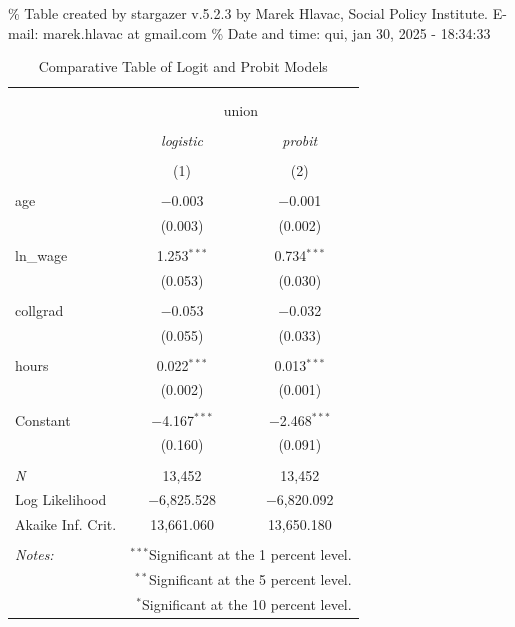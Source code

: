 \documentclass[
]{article}
\begin{document}
\% Table created by stargazer v.5.2.3 by Marek Hlavac, Social Policy
Institute. E-mail: marek.hlavac at gmail.com \% Date and time: qui, jan
30, 2025 - 18:34:33

\begin{table}[!htbp] \centering 
  \caption{Comparative Table of Logit and Probit Models} 
  \label{} 
\begin{tabular}{@{\extracolsep{5pt}}lcc} 
\\[-1.8ex]\hline 
\hline \\[-1.8ex] 
\\[-1.8ex] & \multicolumn{2}{c}{union} \\ 
\\[-1.8ex] & \textit{logistic} & \textit{probit} \\ 
\\[-1.8ex] & (1) & (2)\\ 
\hline \\[-1.8ex] 
 age & $-$0.003 & $-$0.001 \\ 
  & (0.003) & (0.002) \\ 
  & & \\ 
 ln\_wage & 1.253$^{***}$ & 0.734$^{***}$ \\ 
  & (0.053) & (0.030) \\ 
  & & \\ 
 collgrad & $-$0.053 & $-$0.032 \\ 
  & (0.055) & (0.033) \\ 
  & & \\ 
 hours & 0.022$^{***}$ & 0.013$^{***}$ \\ 
  & (0.002) & (0.001) \\ 
  & & \\ 
 Constant & $-$4.167$^{***}$ & $-$2.468$^{***}$ \\ 
  & (0.160) & (0.091) \\ 
  & & \\ 
\textit{N} & 13,452 & 13,452 \\ 
Log Likelihood & $-$6,825.528 & $-$6,820.092 \\ 
Akaike Inf. Crit. & 13,661.060 & 13,650.180 \\ 
\hline 
\hline \\[-1.8ex] 
\textit{Notes:} & \multicolumn{2}{r}{$^{***}$Significant at the 1 percent level.} \\ 
 & \multicolumn{2}{r}{$^{**}$Significant at the 5 percent level.} \\ 
 & \multicolumn{2}{r}{$^{*}$Significant at the 10 percent level.} \\ 
\end{tabular} 
\end{table}
\end{document}
